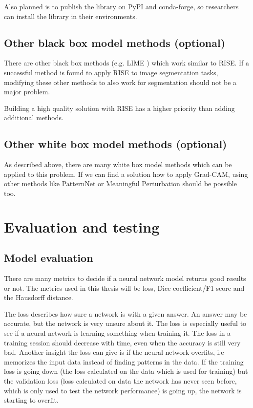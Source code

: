 Also planned is to publish the library on PyPI and conda-forge, so researchers can install the library in their environments.

\subsection{Other black box model methods (optional)}
There are other black box methods (e.g. LIME \cite{ribeiro2016should}) which work similar to RISE. If a successful method is found to apply RISE to image segmentation tasks, modifying these other methods to also work for segmentation should not be a major problem.

Building a high quality solution with RISE has a higher priority than adding additional methods.

\subsection{Other white box model methods (optional)}
As described above, there are many white box model methods which can be applied to this problem. If we can find a solution how to apply Grad-CAM, using other methods like PatternNet \cite{kindermans2017learning} or Meaningful Perturbation \cite{fong2017interpretable} should be possible too.

\section{Evaluation and testing}
\subsection{Model evaluation}
There are many metrics to decide if a neural network model returns good results or not.
The metrics used in this thesis will be loss, Dice coefficient/F1 score and the Hausdorff distance.

The loss describes how sure a network is with a given answer. An answer may be accurate, but the network is very unsure about it. The loss is especially useful to see if a neural network is learning something when training it. The loss in a training session should decrease with time, even when the accuracy is still very bad.
Another insight the loss can give is if the neural network overfits, i.e memorizes the input data instead of finding patterns in the data. If the training loss is going down (the loss calculated on the data which is used for training) but the validation loss (loss calculated on data the network has never seen before, which is only used to test the network performance) is going up, the network is starting to overfit.

